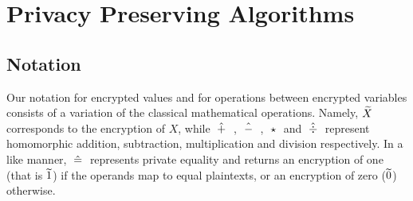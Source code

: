 \chapter{Privacy Preserving Algorithms}\label{c:pp-algorithms}

\section{Notation}\label{s:notation}
Our notation for encrypted values and for operations between encrypted variables consists of a variation of the classical mathematical operations.
Namely, $\widetilde{X}$ corresponds to the encryption of $X$, while $\;\hat{+}\;$ , $\;\hat{-}\;$ , $\;\star\;$ and $\;\hat{\div}\;$ represent homomorphic addition, subtraction, multiplication and division respectively.
In a like manner, $\;\hat{=}\;$ represents private equality and returns an encryption of one (that is $\widetilde{1}$) if the operands map to equal plaintexts, or an encryption of zero ($\widetilde{0}$) otherwise.



